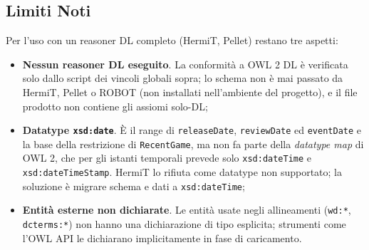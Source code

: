\subsection{Limiti Noti}

Per l'uso con un reasoner DL completo (HermiT, Pellet) restano tre aspetti:
\begin{itemize}[nosep]
  \item \textbf{Nessun reasoner DL eseguito}. La conformit\`a a OWL 2 DL \`e verificata solo
    dallo script dei vincoli globali sopra; lo schema non \`e mai passato da HermiT, Pellet o ROBOT
    (non installati nell'ambiente del progetto), e il file prodotto non contiene gli assiomi solo-DL;
  \item \textbf{Datatype \texttt{xsd:date}}. \`E il range di \texttt{releaseDate},
    \texttt{reviewDate} ed \texttt{eventDate} e la base della restrizione di
    \texttt{RecentGame}, ma non fa parte della \emph{datatype map} di OWL 2, che per gli
    istanti temporali prevede solo \texttt{xsd:dateTime} e \texttt{xsd:dateTimeStamp}.
    HermiT lo rifiuta come datatype non supportato; la soluzione \`e migrare schema e
    dati a \texttt{xsd:dateTime};
  \item \textbf{Entit\`a esterne non dichiarate}. Le entit\`a usate negli allineamenti
    (\texttt{wd:*}, \texttt{dcterms:*}) non hanno una dichiarazione di tipo esplicita;
    strumenti come l'OWL API le dichiarano implicitamente in fase di caricamento.
\end{itemize}

